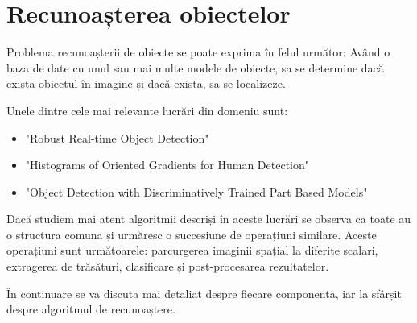 \chapter{Recunoașterea obiectelor}




Problema recunoașterii de obiecte se poate exprima în felul următor:
Având o baza de date cu unul sau mai multe modele de obiecte, sa se determine dacă exista obiectul în imagine și dacă exista, sa se localizeze.

Unele dintre cele mai relevante lucrări din domeniu sunt: 
\begin{itemize}
	\item "Robust Real-time Object Detection" \cite{Viola01robustreal-time}
	\item "Histograms of Oriented Gradients for Human Detection" \cite{Dalal05histogramsof}
	\item "Object Detection with Discriminatively Trained Part Based Models" \cite{Felzenszwalb_objectdetection}
\end{itemize}

Dacă studiem mai atent algoritmii descriși în aceste lucrări se observa ca toate au o structura comuna și urmăresc o succesiune de operațiuni similare.
Aceste operațiuni sunt următoarele: parcurgerea imaginii spațial la diferite scalari, extragerea de trăsături, clasificare și post-procesarea rezultatelor.

În continuare se va discuta mai detaliat despre fiecare componenta, iar la sfârșit despre algoritmul de recunoaștere.

